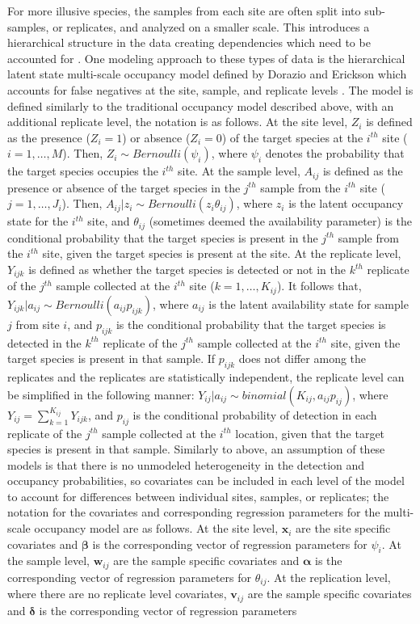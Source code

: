 \documentclass[12pt]{article}\usepackage[]{graphicx}\usepackage[]{color}
\begin{document}
For more illusive species, the samples from each site are often split into sub-samples, or replicates, and analyzed on a smaller scale. This introduces a hierarchical structure in the data creating dependencies which need to be accounted for \cite{MacKenzie}. One modeling approach to these types of data is the hierarchical latent state multi-scale occupancy model defined by Dorazio and Erickson which accounts for false negatives at the site, sample, and replicate levels \cite{Dorazio_Erickson}. The model is defined similarly to the traditional occupancy model described above, with an additional replicate level, the notation is as follows. At the site level, $Z_i$ is defined as the presence ($Z_i = 1$) or absence ($Z_i = 0$) of the target species at the $i^{th}$ site ($i = 1, \dots, M$). Then, $Z_i \sim Bernoulli(\psi_i)$, where $\psi_i$ denotes the probability that the target species occupies the $i^{th}$ site. At the sample level, $A_{ij}$ is defined as the presence or absence of the target species in the $j^{th}$ sample from the $i^{th}$ site ($j = 1, \dots, J_i$). Then, $A_{ij}|z_i \sim Bernoulli(z_i\theta_{ij})$, where $z_i$ is the latent occupancy state for the $i^{th}$ site, and $\theta_{ij}$ (sometimes deemed the availability parameter) is the conditional probability that the target species is present in the $j^{th}$ sample from the $i^{th}$ site, given the target species is present at the site. At the replicate level, $Y_{ijk}$ is defined as whether the target species is detected or not in the $k^{th}$ replicate of the $j^{th}$ sample collected at the $i^{th}$ site ($k = 1, \dots, K_{ij}$). It follows that, $Y_{ijk}|a_{ij} \sim Bernoulli(a_{ij}p_{ijk})$, where $a_{ij}$ is the latent availability state for sample $j$ from site $i$, and $p_{ijk}$ is the conditional probability that the target species is detected in the $k^{th}$ replicate of the $j^{th}$ sample collected at the $i^{th}$ site, given the target species is present in that sample. If $p_{ijk}$ does not differ among the replicates and the replicates are statistically independent, the replicate level can be simplified in the following manner: $Y_{ij}|a_{ij} \sim binomial(K_{ij}, a_{ij}p_{ij})$, where $Y_{ij} = \sum_{k = 1}^{K_{ij}}Y_{ijk}$, and $p_{ij}$ is the conditional probability of detection in each replicate of the $j^{th}$ sample collected at the $i^{th}$ location, given that the target species is present in that sample. Similarly to above, an assumption of these models is that there is no unmodeled heterogeneity in the detection and occupancy probabilities, so covariates can be included in each level of the model to account for differences between individual sites, samples, or replicates; the notation for the covariates and corresponding regression parameters for the multi-scale occupancy model are as follows. At the site level, $\bm{x}_i$ are the site specific covariates and $\bm{\beta}$ is the corresponding vector of regression parameters for $\psi_i$. At the sample level, $\bm{w}_{ij}$ are the sample specific covariates and $\bm{\alpha}$ is the corresponding vector of regression parameters for $\theta_{ij}$. At the replication level, where there are no replicate level covariates, $\bm{v}_{ij}$ are the sample specific covariates and $\bm{\delta}$ is the corresponding vector of regression parameters 
\end{document}
